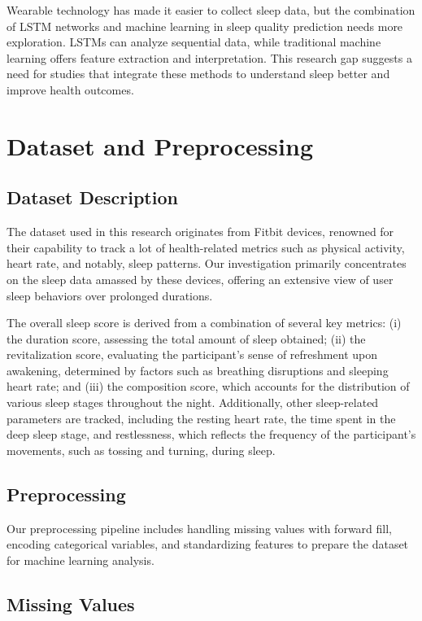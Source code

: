 \documentclass[10pt]{extarticle}
\begin{document}
Wearable technology has made it easier to collect sleep data, but the combination of LSTM networks and machine learning in sleep quality prediction needs more exploration. LSTMs can analyze sequential data, while traditional machine learning offers feature extraction and interpretation. This research gap suggests a need for studies that integrate these methods to understand sleep better and improve health outcomes.

\section{Dataset and Preprocessing}

\subsection{Dataset Description}

The dataset used in this research originates from Fitbit devices, renowned for their capability to track a lot of health-related metrics such as physical activity, heart rate, and notably, sleep patterns. Our investigation primarily concentrates on the sleep data amassed by these devices, offering an extensive view of user sleep behaviors over prolonged durations.

The overall sleep score is derived from a combination of several key metrics: (i) the duration score, assessing the total amount of sleep obtained; (ii) the revitalization score, evaluating the participant's sense of refreshment upon awakening, determined by factors such as breathing disruptions and sleeping heart rate; and (iii) the composition score, which accounts for the distribution of various sleep stages throughout the night. Additionally, other sleep-related parameters are tracked, including the resting heart rate, the time spent in the deep sleep stage, and restlessness, which reflects the frequency of the participant's movements, such as tossing and turning, during sleep.


\subsection{Preprocessing}

Our preprocessing pipeline includes handling missing values with forward fill, encoding categorical variables, and standardizing features to prepare the dataset for machine learning analysis.

\subsection{Missing Values}
\end{document}
